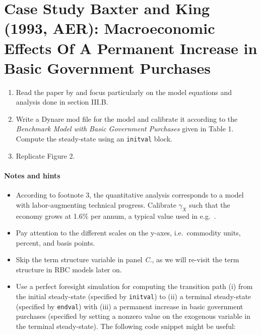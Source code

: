\section[Case Study Baxter and King (1993, AER): Macroeconomic Effects Of A Permanent Increase in Basic Government Purchases]{Case Study Baxter and King (1993, AER): Macroeconomic Effects Of A Permanent Increase in Basic Government Purchases\label{ex:CaseStudy.BaxterKing.Figure2}}

\begin{enumerate}
    \item Read the paper by \textcite{Baxter.King_1993_FiscalPolicyGeneral} and focus particularly on the model equations and analysis done in section III.B.
    \item Write a Dynare mod file for the model and calibrate it according to the \emph{Benchmark Model with Basic Government Purchases} given in Table 1.
    Compute the steady-state using an \texttt{initval} block.
    \item Replicate Figure 2.
\end{enumerate}
\paragraph{Notes and hints}
\begin{itemize}
    \item According to footnote 3, the quantitative analysis corresponds to a model with labor-augmenting technical progress.
    Calibrate $\gamma_X$ such that the economy grows at 1.6\% per annum, a typical value used in e.g.\ \textcite{King.Plosser.Rebelo_1988_ProductionGrowthBusiness}.
    \item Pay attention to the different scales on the y-axes, i.e.\ commodity units, percent, and basis points.
    \item Skip the term structure variable in panel \emph{C.}, as we will re-visit the term structure in RBC models later on.
    \item Use a perfect foresight simulation for computing the transition path
      (i) from the initial steady-state (specified by \texttt{initval}) to
      (ii) a terminal steady-state (specified by \texttt{endval}) with
      (iii) a permanent increase in basic government purchases (specified by setting a nonzero value on the exogenous variable in the terminal steady-state).
    The following code snippet might be useful:
\end{itemize}

